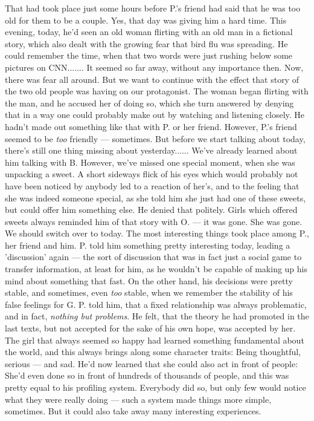 That had took place just some hours before P.'s friend had said that he was too old for them to be a couple. Yes, that day was giving him a hard time. 
This evening, today, he'd seen an old woman flirting with an old man in a fictional story, which also dealt with the growing fear that bird flu was spreading. He could remember the time, when that two words were just rushing below some pictures on CNN.......
It seemed so far away, without any importance then. Now, there was fear all around. 
But we want to continue with the effect that story of the two old people was having on our protagonist. The woman began flirting with the man, and he accused her of doing so, which she turn answered by denying that in a way one could probably make out by watching and listening closely. 
He hadn't made out something like that with P. or her friend. However, P.'s friend seemed to be \emph{too} friendly --- sometimes. But before we start talking about today, there's still one thing missing about yesterday......
We've already learned about him talking with B. However, we've missed one special moment, when she was unpacking a sweet. A short sideways flick of his eyes which would probably not have been noticed by anybody led to a reaction of her's, and to the feeling that she was indeed someone special, as she told him she just had one of these sweets, but could offer him something else. He denied that politely. 
Girls which offered sweets always reminded him of that story with O. --- it was gone. 
She was gone. 
We should switch over to today. 
The most interesting things took place among P., her friend and him. P. told him something pretty interesting today, leading a 'discussion' again --- the sort of discussion that was in fact just a social game to transfer information, at least for him, as he wouldn't be capable of making up his mind about something that fast. On the other hand, his decisions were pretty stable, and sometimes, even \emph{too} stable, when we remember the stability of his false feelings for G. 
P. told him, that a fixed relationship was always problematic, and in fact, \emph{nothing but problems}. He felt, that the theory he had promoted in the last texts, but not accepted for the sake of his own hope, was accepted by her. The girl that always seemed so happy had learned something fundamental about the world, and this always brings along some character traits: Being thoughtful, serious --- and sad. He'd now learned that she could also act in front of people: She'd even done so in front of hundreds of thousands of people, and this was pretty equal to his profiling system. Everybody did so, but only few would notice what they were really doing --- such a system made things more simple, sometimes. But it could also take away many interesting experiences. 
